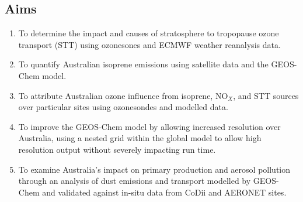 
\subsection{Aims}
\begin{enumerate}
\item To determine the impact and causes of stratosphere to tropopause ozone transport (STT) using ozonesones and ECMWF weather reanalysis data.
\item To quantify Australian isoprene emissions using satellite data and the GEOS-Chem model. 
\item To attribute Australian ozone influence from isoprene, NO$_X$, and STT sources over particular sites using ozonesondes and modelled data.
\item To improve the GEOS-Chem model by allowing increased resolution over Australia, using a nested grid within the global model to allow high resolution output without severely impacting run time.
\item To examine Australia's impact on primary production and aerosol pollution through an analysis of dust emissions and transport modelled by GEOS-Chem and validated against in-situ data from CoDii and AERONET sites.
\end{enumerate}